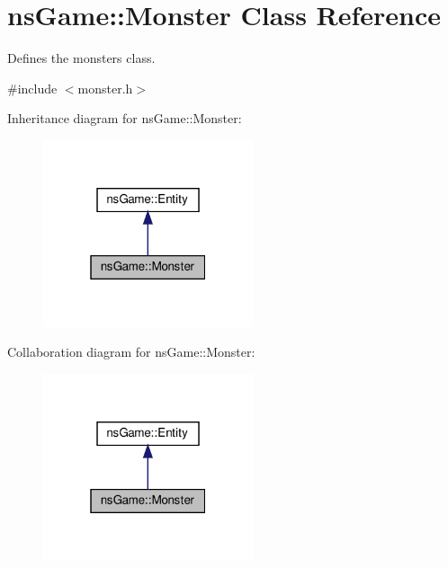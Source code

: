 \hypertarget{classns_game_1_1_monster}{}\section{ns\+Game\+:\+:Monster Class Reference}
\label{classns_game_1_1_monster}


Defines the monsters class.  




{\ttfamily \#include $<$monster.\+h$>$}



Inheritance diagram for ns\+Game\+:\+:Monster\+:\nopagebreak
\begin{figure}[H]
\begin{center}
\leavevmode
\includegraphics[width=175pt]{classns_game_1_1_monster__inherit__graph}
\end{center}
\end{figure}


Collaboration diagram for ns\+Game\+:\+:Monster\+:\nopagebreak
\begin{figure}[H]
\begin{center}
\leavevmode
\includegraphics[width=175pt]{classns_game_1_1_monster__coll__graph}
\end{center}
\end{figure}
